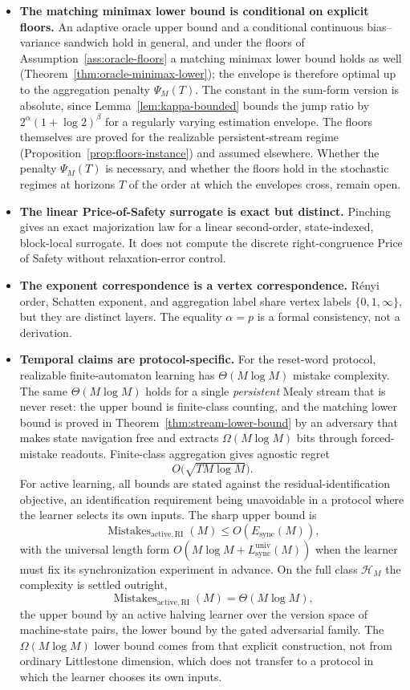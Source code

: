 \documentclass[12pt]{article}
\theoremstyle{definition}
\newcommand{\PsiAgg}{\Psi}
\newcommand{\Lsyncu}{L_{\mathrm{sync}}^{\mathrm{univ}}}
\newcommand{\Esync}{E_{\mathrm{sync}}}
\newcommand{\MistRI}{\operatorname{Mistakes}_{\mathrm{active,RI}}}
\begin{document}
\begin{itemize}[leftmargin=1.8em]
\item \textbf{The matching minimax lower bound is conditional on explicit
floors.}
An adaptive oracle upper bound and a conditional continuous bias--variance
sandwich hold in general, and under the floors of
Assumption~\ref{ass:oracle-floors} a matching minimax lower bound holds as well
(Theorem~\ref{thm:oracle-minimax-lower}); the envelope is therefore optimal up
to the aggregation penalty $\PsiAgg_M(T)$.  The constant in the sum-form
version is absolute, since Lemma~\ref{lem:kappa-bounded} bounds the jump ratio
by $2^\alpha(1+\log2)^\beta$ for a regularly varying estimation envelope.  The
floors themselves are proved for the realizable persistent-stream regime
(Proposition~\ref{prop:floors-instance}) and assumed elsewhere.  Whether the
penalty $\PsiAgg_M(T)$ is necessary, and whether the floors hold in the
stochastic regimes at horizons $T$ of the order at which the envelopes cross,
remain open.

\item \textbf{The linear Price-of-Safety surrogate is exact but distinct.}
Pinching gives an exact majorization law for a linear second-order,
state-indexed, block-local surrogate.  It does not compute the discrete
right-congruence Price of Safety without relaxation-error control.

\item \textbf{The exponent correspondence is a vertex correspondence.}
R\'enyi order, Schatten exponent, and aggregation label share vertex labels
$\{0,1,\infty\}$, but they are distinct layers.  The equality $\alpha=p$ is
a formal consistency, not a derivation.

\item \textbf{Temporal claims are protocol-specific.}
For the reset-word protocol, realizable finite-automaton learning has
$\Theta(M\log M)$ mistake complexity.  The same $\Theta(M\log M)$ holds for a
single \emph{persistent} Mealy stream that is never reset: the upper bound is
finite-class counting, and the matching lower bound is proved in
Theorem~\ref{thm:stream-lower-bound} by an adversary that makes state
navigation free and extracts $\Omega(M\log M)$ bits through forced-mistake
readouts.  Finite-class aggregation gives agnostic regret
\[
O\bigl(\sqrt{T M\log M}\bigr).
\]
For active learning, all bounds are stated against the residual-identification
objective, an identification requirement being unavoidable in a protocol where
the learner selects its own inputs.  The sharp upper bound is
\[
\MistRI(M)
\le
O(\Esync(M)),
\]
with the universal length form $O(M\log M+\Lsyncu(M))$ when the learner must
fix its synchronization experiment in advance.  On the full class
$\mathcal H_M$ the complexity is settled outright,
\[
\MistRI(M)
=
\Theta(M\log M),
\]
the upper bound by an active halving learner over the version space of
machine-state pairs, the lower bound by the gated adversarial family.  The
$\Omega(M\log M)$ lower bound comes from that explicit construction,
not from ordinary Littlestone dimension, which does not transfer to a protocol
in which the learner chooses its own inputs.


\end{itemize}
\end{document}

